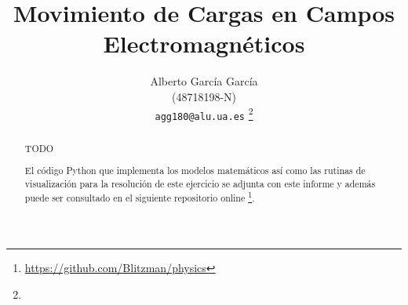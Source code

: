 \documentclass[journal]{IEEEtran}
\begin{document}
%
\title{Movimiento de Cargas en Campos Electromagnéticos}
%
%
%

\author{Alberto García García\\ (48718198-N)\\ \texttt{agg180@alu.ua.es} %
\thanks{}%
}


%
{}
% 


\maketitle

\begin{abstract}
TODO

El código Python que implementa los modelos matemáticos así como las rutinas de visualización para la resolución de este ejercicio se adjunta con este informe y además puede ser consultado en el siguiente repositorio online \footnote{\url{https://github.com/Blitzman/physics}}.
\end{abstract}


%
\IEEEpeerreviewmaketitle
\end{document}
